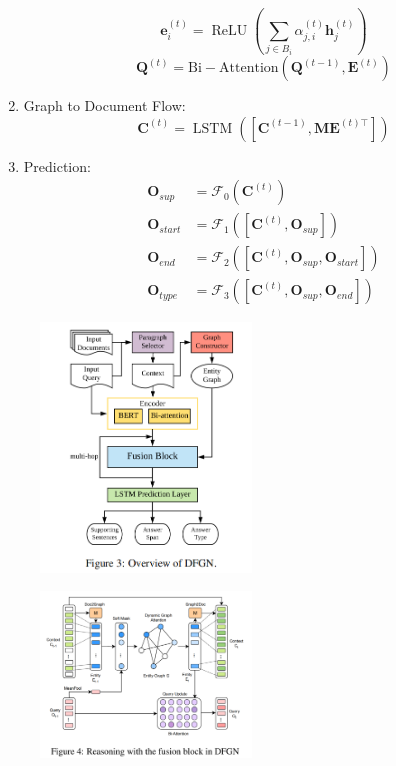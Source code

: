 \documentclass[a4paper,UTF8]{article}
\numberwithin{equation}{section}
\begin{document}
\begin{enumerate}
\begin{equation}
	\end{equation}
	\begin{equation}
		\mathbf{e}_{i}^{(t)}=\operatorname{ReLU}\left(\sum_{j \in B_{i}} \alpha_{j, i}^{(t)} \mathbf{h}_{j}^{(t)}\right)
		\end{equation}
		\begin{equation}
			\mathbf{Q}^{(t)}=\mathrm{Bi}-\mathrm{Attention}\left(\mathbf{Q}^{(t-1)}, \mathbf{E}^{(t)}\right)
			\end{equation}
	\item Graph to Document Flow:\begin{equation}
		\mathbf{C}^{(t)}=\operatorname{LSTM}\left(\left[\mathbf{C}^{(t-1)}, \mathbf{M} \mathbf{E}^{(t) \top}\right]\right)
		\end{equation}
	\item Prediction:
	\begin{equation}
	\begin{aligned} \mathbf{O}_{s u p} &=\mathcal{F}_{0}\left(\mathbf{C}^{(t)}\right) \\ \mathbf{O}_{s t a r t} &=\mathcal{F}_{1}\left(\left[\mathbf{C}^{(t)}, \mathbf{O}_{s u p}\right]\right) \\ \mathbf{O}_{e n d} &=\mathcal{F}_{2}\left(\left[\mathbf{C}^{(t)}, \mathbf{O}_{s u p}, \mathbf{O}_{s t a r t}\right]\right) \\ \mathbf{O}_{t y p e} &=\mathcal{F}_{3}\left(\left[\mathbf{C}^{(t)}, \mathbf{O}_{s u p}, \mathbf{O}_{e n d}\right]\right) \end{aligned}
	\end{equation}
\end{enumerate}
\begin{figure}[H]
	\centering
	\includegraphics[width=0.5\textwidth]{9-2.png}
\end{figure}
\begin{figure}[H]
	\centering
	\includegraphics[width=0.5\textwidth]{9-3.png}
\end{figure}
\end{document}
